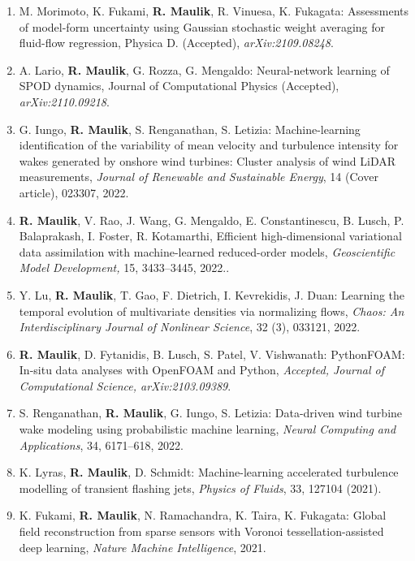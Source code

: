 \documentclass[letterpaper]{article}
\begin{document}
\begin{enumerate}

\item M. Morimoto, K. Fukami, \textbf{R. Maulik}, R. Vinuesa, K. Fukagata: Assessments of model-form uncertainty using Gaussian stochastic weight averaging for fluid-flow regression, Physica D. (Accepted), {\it arXiv:2109.08248}.

\item A. Lario, \textbf{R. Maulik}, G. Rozza, G. Mengaldo: Neural-network learning of SPOD dynamics, Journal of Computational Physics (Accepted), {\it arXiv:2110.09218}.

\item G. Iungo, \textbf{R. Maulik}, S. Renganathan, S. Letizia: Machine-learning identification of the variability of mean velocity and turbulence intensity for wakes generated by onshore wind turbines: Cluster analysis of wind LiDAR measurements, {\it Journal of Renewable and Sustainable Energy}, 14 (Cover article), 023307, 2022.

\item \textbf{R. Maulik}, V. Rao, J. Wang, G. Mengaldo, E. Constantinescu, B. Lusch, P. Balaprakash, I. Foster, R. Kotamarthi, Efficient high-dimensional variational data assimilation with machine-learned reduced-order models, {\it Geoscientific Model Development,} 15, 3433–3445, 2022..

\item Y. Lu, \textbf{R. Maulik}, T. Gao, F. Dietrich, I. Kevrekidis, J. Duan: Learning the temporal evolution of multivariate densities via normalizing flows, {\it Chaos: An Interdisciplinary Journal of Nonlinear Science}, 32 (3), 033121, 2022.

\item \textbf{R. Maulik}, D. Fytanidis, B. Lusch, S. Patel, V. Vishwanath: PythonFOAM: In-situ data analyses with OpenFOAM and Python, {\it Accepted, Journal of Computational Science, arXiv:2103.09389}.

\item S. Renganathan, \textbf{R. Maulik}, G. Iungo, S. Letizia: Data-driven wind turbine wake modeling using probabilistic machine learning, {\it Neural Computing and Applications}, 34, 6171–618, 2022.

\item K. Lyras, \textbf{R. Maulik}, D. Schmidt: Machine-learning accelerated turbulence modelling of transient flashing jets, {\it Physics of Fluids}, 33, 127104 (2021).

\item K. Fukami, \textbf{R. Maulik}, N. Ramachandra, K. Taira, K. Fukagata: Global field reconstruction from sparse sensors with Voronoi tessellation-assisted deep learning, {\it Nature Machine Intelligence}, 2021.


\end{enumerate}
\end{document}
